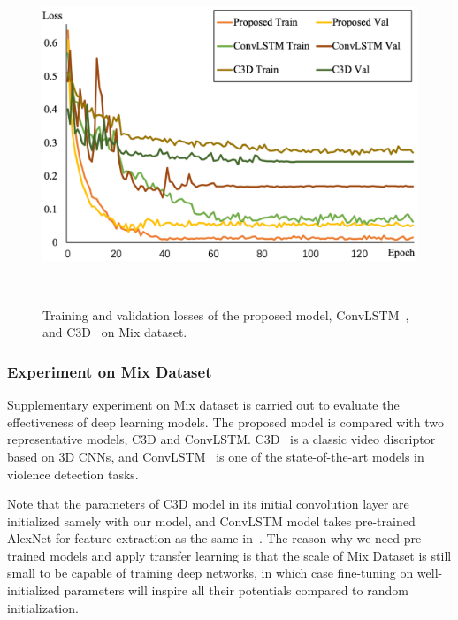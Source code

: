 \documentclass[10pt,twocolumn,letterpaper]{article}
\begin{document}
\begin{figure}[t]
\begin{center}
\includegraphics[scale=0.46]{fig/fig3.png}
\end{center}
\caption{Training and validation losses of the proposed model, ConvLSTM~\cite{convlstm_sudh}, and C3D~\cite{3dcnn_1} on Mix dataset.}
~\label{fig:mix}
\end{figure}


\subsubsection{Experiment on Mix Dataset}

Supplementary experiment on Mix dataset is carried out to evaluate the effectiveness of deep learning models.
The proposed model is compared with two representative models, C3D and ConvLSTM.
C3D~\cite{3dcnn_1} is a classic video discriptor based on 3D CNNs, and ConvLSTM~\cite{convlstm_sudh} is one of the state-of-the-art models in violence detection tasks.
 
Note that the parameters of C3D model in its initial convolution layer are initialized samely with our model, and ConvLSTM model takes pre-trained AlexNet for feature extraction as the same in~\cite{convlstm_sudh}.
The reason why we need pre-trained models and apply transfer learning is that the scale of Mix Dataset is still small to be capable of training deep networks, in which case fine-tuning on well-initialized parameters will inspire all their potentials compared to random initialization.
\end{document}
